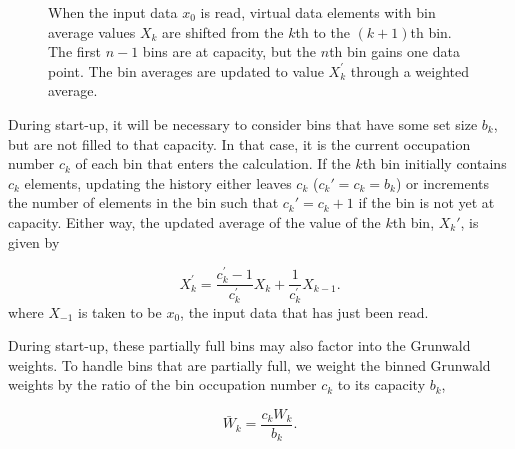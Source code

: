 \begin{figure}
\label{fig:binShifting}
\caption{When the input data $x_0$ is read, virtual data elements with bin average values $X_k$ are shifted from the $k$th to the $(k+1)$th bin. The first $n-1$ bins are at capacity, but the $n$th bin gains one data point. The bin averages are updated to value $X_k^\prime$ through a weighted average.}
\end{figure}

During start-up, it will be necessary to consider bins that have some
set size $b_k$, but are not filled to that capacity. In that case, it
is the current occupation number $c_k$ of each bin that enters the
calculation. If the $k$th bin initially contains $c_k$ elements,
updating the history either leaves $c_k$ ($c_k\prime=c_k=b_k$) or
increments the number of elements in the bin such that $c_k\prime =
c_k + 1$ if the bin is not yet at capacity. Either way, the updated
average of the value of the $k$th bin, $X_k\prime$, is given by

\begin{equation}
X_k^\prime = \frac{c_k^\prime-1}{c_k^\prime}X_k + \frac{1}{c_k^\prime}X_{k-1}.
\label{eqn:updating}
\end{equation}
where $X_{-1}$ is taken to be $x_0$, the input data that has just been
read. 

During start-up, these partially full bins may also factor into
the Grunwald weights. To handle bins that are partially full, we
weight the binned Grunwald weights by the ratio of the bin occupation
number $c_k$ to its capacity $b_k$,

\begin{equation}
\bar{W}_k= \frac{c_k W_k}{b_k}.
\label{eqn:Wbar}
\end{equation} 









